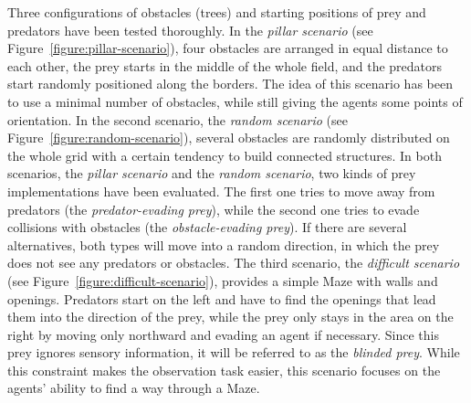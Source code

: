 \documentclass{sig-alternate}
\begin{document}
Three configurations of obstacles (trees) and star\-ting positions of prey and predators have been tested thoroughly. In the \emph{pillar scenario} (see Figure~\ref{figure:pillar-scenario}), four obstacles are arranged in equal distance to each other, the prey starts in the middle of the whole field, and the predators start randomly positioned along the borders. The idea of this scenario has been to use a minimal number of obstacles, while still giving the agents some points of orientation.
In the second scenario, the \emph{random scenario} (see Figure~\ref{figure:random-scenario}), several obstacles are randomly distributed on the whole grid with a certain tendency to build connected structures. In both scenarios, the \emph{pillar scenario} and the \emph{random scenario}, two kinds of prey implementations have been evaluated. The first one tries to move away from predators (the \emph{predator-evading prey}), while the second one tries to evade collisions with obstacles (the \emph{obstacle-evading prey}). %
If there are several alternatives, both types will move into a random direction, in which the prey does not see any predators or obstacles. The third scenario, the \emph{difficult scenario} (see Figure~\ref{figure:difficult-scenario}), provides a simple Maze with walls and openings. Predators start on the left and have to find the openings that lead them into the direction of the prey, while the prey only stays in the area on the right by moving only northward and evading an agent if necessary. %
Since this prey ignores sensory information, it will be referred to as the \emph{blinded prey}. While this constraint makes the observation task easier, this scenario focuses on the agents' ability to find a way through a Maze. %
\end{document}
